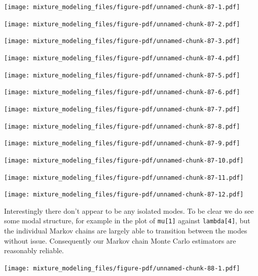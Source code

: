 \documentclass[
  letterpaper,
  DIV=11,
  numbers=noendperiod]{scrartcl}
\newenvironment{Shaded}{\begin{snugshade}}{\end{snugshade}}
\newcommand{\FunctionTok}[1]{\textcolor[rgb]{0.28,0.35,0.67}{#1}}
\newcommand{\NormalTok}[1]{\textcolor[rgb]{0.00,0.23,0.31}{#1}}
\newcommand{\SpecialCharTok}[1]{\textcolor[rgb]{0.37,0.37,0.37}{#1}}
\newcommand{\StringTok}[1]{\textcolor[rgb]{0.13,0.47,0.30}{#1}}
\begin{document}
\texttt{[image: mixture\_modeling\_files/figure-pdf/unnamed-chunk-87-1.pdf]}

\texttt{[image: mixture\_modeling\_files/figure-pdf/unnamed-chunk-87-2.pdf]}

\texttt{[image: mixture\_modeling\_files/figure-pdf/unnamed-chunk-87-3.pdf]}

\texttt{[image: mixture\_modeling\_files/figure-pdf/unnamed-chunk-87-4.pdf]}

\texttt{[image: mixture\_modeling\_files/figure-pdf/unnamed-chunk-87-5.pdf]}

\texttt{[image: mixture\_modeling\_files/figure-pdf/unnamed-chunk-87-6.pdf]}

\texttt{[image: mixture\_modeling\_files/figure-pdf/unnamed-chunk-87-7.pdf]}

\texttt{[image: mixture\_modeling\_files/figure-pdf/unnamed-chunk-87-8.pdf]}

\texttt{[image: mixture\_modeling\_files/figure-pdf/unnamed-chunk-87-9.pdf]}

\texttt{[image: mixture\_modeling\_files/figure-pdf/unnamed-chunk-87-10.pdf]}

\texttt{[image: mixture\_modeling\_files/figure-pdf/unnamed-chunk-87-11.pdf]}

\texttt{[image: mixture\_modeling\_files/figure-pdf/unnamed-chunk-87-12.pdf]}

Interestingly there don't appear to be any isolated modes. To be clear
we do see some modal structure, for example in the plot of
\texttt{mu{[}1{]}} against \texttt{lambda{[}4{]}}, but the individual
Markov chains are largely able to transition between the modes without
issue. Consequently our Markov chain Monte Carlo estimators are
reasonably reliable.

\begin{Shaded}
\end{Shaded}

\texttt{[image: mixture\_modeling\_files/figure-pdf/unnamed-chunk-88-1.pdf]}
\end{document}
